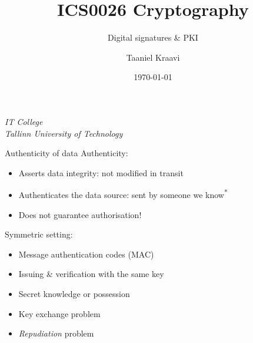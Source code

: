 \graphicspath{ {../../images/} }
\usetikzlibrary{external}

\title{ICS0026 Cryptography}
\subtitle{Digital signatures \& PKI}
\date{\today}
\author{Taaniel Kraavi}
\institute%
{%
  \textit{IT College}\\
  \textit{Tallinn University of Technology}
}


\begin{frame}
  \titlepage
\end{frame}

\begin{frame}{Authenticity of data}
  Authenticity:
  \begin{itemize}[<+(1)->]
    \item Asserts data integrity: not modified in transit
    \item Authenticates the data source: sent by someone we know\textsuperscript{*}
    \item Does not guarantee authorisation!
  \end{itemize}

  \pause
  Symmetric setting:
  \begin{itemize}[<+(1)->]
    \item Message authentication codes (MAC)
    \item Issuing \& verification with the same key
    \item Secret knowledge or possession
    \item Key exchange problem
    \item \emph{Repudiation} problem
  \end{itemize}
\end{frame}

